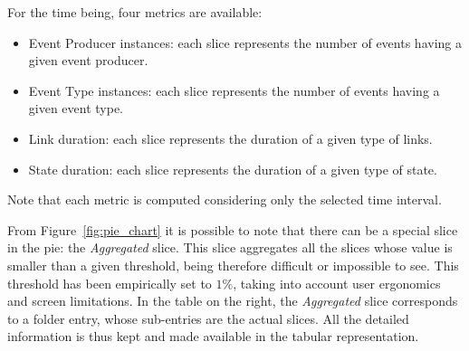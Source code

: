 \documentclass[twoside]{article}
\begin{document}
\begin{sloppypar}
For the time being, four metrics are available: 
\begin{itemize}
 \item Event Producer instances: each slice represents the number of events having a given event producer.
 \item Event Type instances: each slice represents the number of events having a given event type.
 \item Link duration: each slice represents the duration of a given type of links.
 \item State duration: each slice represents the duration of a given type of state.
\end{itemize}
Note that each metric is computed considering only the selected time interval.

From Figure~\ref{fig:pie_chart} it is possible to note that there can be a special slice in the pie: the \emph{Aggregated} slice.
This slice aggregates all the slices whose value is smaller than a given threshold, being therefore difficult or impossible to see.
This threshold has been empirically set to $1\%$, taking into account user ergonomics and screen limitations.
In the table on the right, the \emph{Aggregated} slice corresponds to a folder entry, whose sub-entries are the actual slices.
All the detailed information is thus kept and made available in the tabular representation.


\end{sloppypar}
\end{document}

